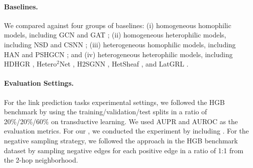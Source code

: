 \begin{table}[H]
  \centering
  \caption{Heterogeneous link-prediction dataset statistics. The N column indicates nodes, E indicates the number of edges, and C indicates classes.}
  \label{tab:link-datasets}
  \small
\end{table}


\paragraph{Baselines.} We compared \method{} against four groups of baselines: (i) homogeneous homophilic models, including GCN \cite{kipf2017gcn} and GAT \cite{velickovic2018gat}; (ii) homogeneous heterophilic models, including NSD \cite{bodnar2022neural} and CSNN \cite{ribeiro2026cooperative}; (iii) heterogeneous homophilic models, including HAN \cite{wang2019han} and PSHGCN \cite{he2024spectral}; and (iv) heterogeneous heterophilic models, including HDHGR \cite{guo2023homophily}, Hetero$^2$Net \cite{li2025hetero2net}, H2SGNN \cite{lu2026addressing}, HetSheaf \cite{braithwaite2024heterogeneous}, and LatGRL \cite{shen2025heterophily}.

\paragraph{Evaluation Settings.} For the link prediction tasks experimental settings, we followed the HGB benchmark \cite{lv2021hgb} by using the training/validation/test splits in a ratio of 20\%/20\%/60\% on transductive learning. We used AUPR and AUROC as the evaluation metrics. For our \method{}, we conducted the experiment by including \ampss{}. For the negative sampling strategy, we followed the approach in the HGB benchmark dataset \cite{lv2021hgb} by sampling negative edges for each positive edge in a ratio of 1:1 from the 2-hop neighborhood.

